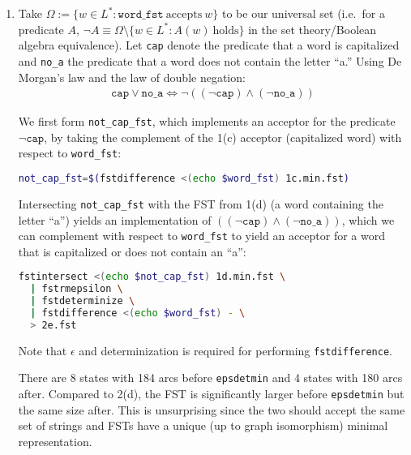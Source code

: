 \documentclass[a4paper,oneside,reqno]{amsart}
\begin{document}
\begin{enumerate}[label=\arabic*.]
\begin{enumerate}[label=(\alph*)]
      \item Take $\Omega := \{ w \in L^* :
        \texttt{word\_fst}~\text{accepts}~w\}$ to be our universal set (i.e.\
        for a predicate $A$, $\lnot A \equiv \Omega \setminus \{w \in L^*:
        A(w)~\text{holds}\}$ in the set theory/Boolean algebra equivalence).
        Let \texttt{cap} denote the predicate that a word is capitalized and
        \texttt{no\_a} the predicate that a word does not contain the letter
        ``a.'' Using De Morgan's law and the law of double negation:
        \begin{align}
          \texttt{cap} \lor \texttt{no\_a} \iff
          \lnot ((\lnot \texttt{cap}) \land (\lnot \texttt{no\_a}))
        \end{align}

        We first form \texttt{not\_cap\_fst}, which implements an acceptor for
        the predicate $\lnot \texttt{cap}$, by taking the complement of the
        1(c) acceptor (capitalized word) with respect to \texttt{word\_fst}:
        \begin{lstlisting}[language=bash]
not_cap_fst=$(fstdifference <(echo $word_fst) 1c.min.fst)
        \end{lstlisting}

        Intersecting \texttt{not\_cap\_fst} with the FST from 1(d) (a word
        containing the letter ``a'') yields an implementation of $((\lnot
        \texttt{cap}) \land (\lnot \texttt{no\_a}))$, which we can complement
        with respect to \texttt{word\_fst} to yield an acceptor for a word that
        is capitalized or does not contain an ``a'':
        \begin{lstlisting}[language=bash]
fstintersect <(echo $not_cap_fst) 1d.min.fst \
  | fstrmepsilon \
  | fstdeterminize \
  | fstdifference <(echo $word_fst) - \
  > 2e.fst
        \end{lstlisting}
        Note that $\epsilon$ and determinization is required for
        performing \texttt{fstdifference}.

        There are 8 states with 184 arcs before \texttt{epsdetmin} and 4 states
        with 180 arcs after. Compared to 2(d), the FST is significantly larger
        before \texttt{epsdetmin} but the same size after. This is unsurprising
        since the two should accept the same set of strings and FSTs have a
        unique (up to graph isomorphism) minimal representation.
    \end{enumerate}


\end{enumerate}
\end{document}
